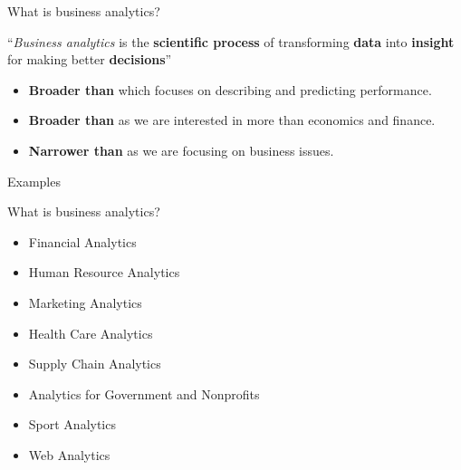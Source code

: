 \documentclass[14pt]{beamer}
\begin{document}
\begin{frame}{What is business analytics?}


\begin{block}{}
``\emph{Business analytics} is the \textbf{scientific process} of transforming \textbf{data} into \textbf{insight} for making better \textbf{decisions}''
\end{block}
\begin{itemize}
\item \textbf{Broader than } which focuses on describing and predicting performance.
\item \textbf{Broader than } as we are interested in more than economics and  finance.
\item \textbf{Narrower than } as we are focusing on {business issues}.
\end{itemize}

\end{frame}



\begin{frame}{Examples}


\end{frame}

\begin{frame}{What is business analytics?}

{\small
\begin{itemize}
	\item Financial Analytics
	\item Human Resource Analytics	
	\item Marketing Analytics
	\item Health Care Analytics
	\item Supply Chain Analytics
	\item Analytics for Government and Nonprofits
	\item Sport Analytics
	\item Web Analytics
\end{itemize}
}

\end{frame}
\end{document}
